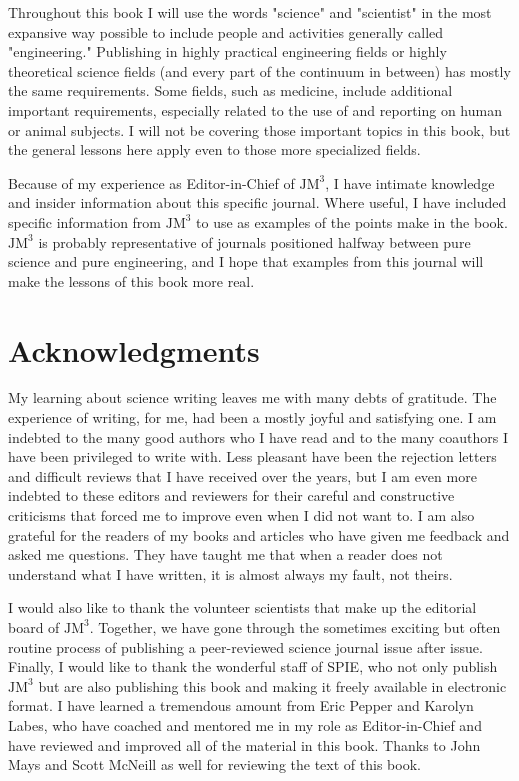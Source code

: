 Throughout this book I will use the words "science" and "scientist" in the most expansive way possible to include people and activities generally called "engineering." Publishing in highly practical engineering fields or highly theoretical science fields (and every part of the continuum in between) has mostly the same requirements. Some fields, such as medicine, include additional important requirements, especially related to the use of and reporting on human or animal subjects. I will not be covering those important topics in this book, but the general lessons here apply even to those more specialized fields.

Because of my experience as Editor-in-Chief of $\mathrm{JM}^{3}$, I have intimate knowledge and insider information about this specific journal. Where useful, I have included specific information from $\mathrm{JM}^{3}$ to use as examples of the points  make in the book. $\mathrm{JM}^{3}$ is probably representative of journals positioned halfway between pure science and pure engineering, and I hope that examples from this journal will make the lessons of this book more real.

\section*{Acknowledgments}
My learning about science writing leaves me with many debts of gratitude. The experience of writing, for me, had been a mostly joyful and satisfying one. I am indebted to the many good authors who I have read and to the many coauthors I have been privileged to write with. Less pleasant have been the rejection letters and difficult reviews that I have received over the years, but I am even more indebted to these editors and reviewers for their careful and constructive criticisms that forced me to improve even when I did not want to. I am also grateful for the readers of my books and articles who have given me feedback and asked me questions. They have taught me that when a reader does not understand what I have written, it is almost always my fault, not theirs.

I would also like to thank the volunteer scientists that make up the editorial board of $\mathrm{JM}^{3}$. Together, we have gone through the sometimes exciting but often routine process of publishing a peer-reviewed science journal issue after issue. Finally, I would like to thank the wonderful staff of SPIE, who not only publish $\mathrm{JM}^{3}$ but are also publishing this book and making it freely available in electronic format. I have learned a tremendous amount from Eric Pepper and Karolyn Labes, who have coached and mentored me in my role as Editor-in-Chief and have reviewed and improved all of the material in this book. Thanks to John Mays and Scott McNeill as well for reviewing the text of this book.

